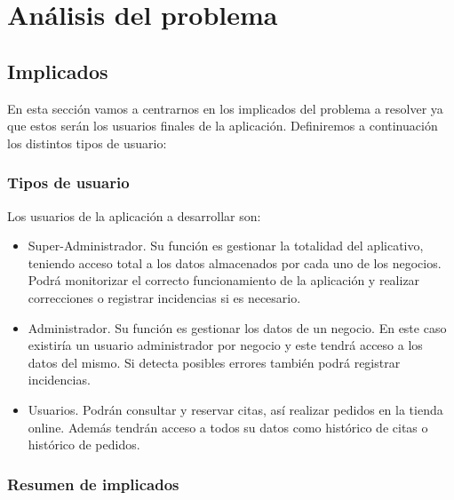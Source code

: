 \chapter{Análisis del problema}

\section{Implicados}

En esta sección vamos a centrarnos en los implicados del problema a resolver ya que estos serán los usuarios finales de
la aplicación. Definiremos a continuación los distintos tipos de usuario:

\subsection{Tipos de usuario}

Los usuarios de la aplicación a desarrollar son:

\begin{itemize}
    \item Super-Administrador. Su función es gestionar la totalidad del aplicativo, teniendo acceso total a los datos
    almacenados por cada uno de los negocios. Podrá monitorizar el correcto funcionamiento de la aplicación y realizar
    correcciones o registrar incidencias si es necesario.

    \item Administrador. Su función es gestionar los datos de un negocio. En este caso existiría un usuario
    administrador por negocio y este tendrá acceso a los datos del mismo. Si detecta posibles errores también
    podrá registrar incidencias.

    \item Usuarios. Podrán consultar y reservar citas, así realizar pedidos en la tienda online.
    Además tendrán acceso a todos su datos como histórico de citas o histórico de pedidos.
\end{itemize}

\subsection{Resumen de implicados}

